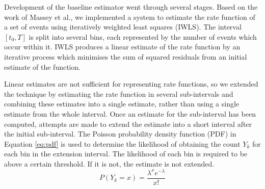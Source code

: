 \documentclass[11pt]{article}
\begin{document}
   Development of the baseline estimator went through several stages. Based on
   the work of Massey et al.\cite{massey}, we implemented a system to estimate
   the rate function of a set of events using iteratively weighted least squares
   (IWLS). The interval $[t_0,T]$ is split into several bins, each represented
   by the number of events which occur within it. IWLS produces a linear
   estimate of the rate function by an iterative process which minimises the sum
   of squared residuals from an initial estimate of the function.

   Linear estimates are not sufficient for representing rate functions, so we
   extended the technique by estimating the rate function in several
   sub-intervals and combining these estimates into a single estimate, rather
   than using a single estimate from the whole interval. Once an estimate for
   the sub-interval has been computed, attempts are made to extend the estimate
   into a short interval after the initial sub-interval. The Poisson probability
   density function (PDF) in Equation \ref{eq:pdf} is used to determine the
   likelihood of obtaining the count $Y_k$ for each bin in the extension
   interval. The likelihood of each bin is required to be above a certain
   threshold. If it is not, the estimate is not extended.
    \begin{equation}
    \label{eq:pdf}
    P(Y_k=x)=\frac{\lambda^xe^{-\lambda}}{x!}
    \end{equation}

    
\end{document}
